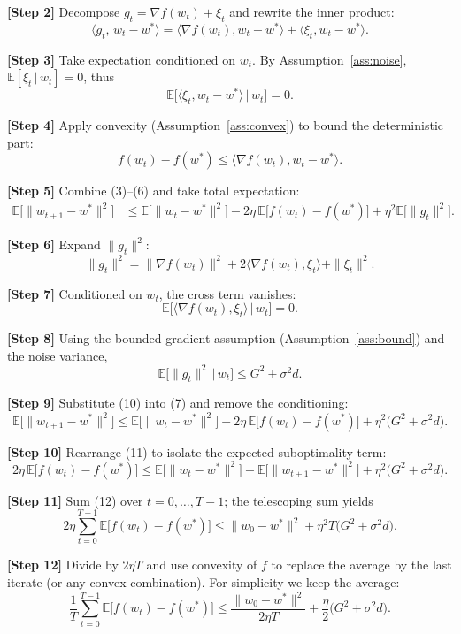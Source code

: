 \documentclass{article}
\newcommand{\E}{\mathbb{E}}
\begin{document}
\noindent\textbf{[Step 2]}  Decompose $g_t=\nabla f(w_t)+\xi_t$ and rewrite the inner product:
\[
\langle g_t,\,w_t-w^{*}\rangle
= \langle\nabla f(w_t),w_t-w^{*}\rangle
+ \langle\xi_t,w_t-w^{*}\rangle .
\tag{4}
\]

\noindent\textbf{[Step 3]}  Take expectation conditioned on $w_t$.  By Assumption~\ref{ass:noise}, $\E[\xi_t\,|\,w_t]=0$, thus
\[
\E\!\big[\langle\xi_t,w_t-w^{*}\rangle\,\big|\,w_t\big]=0.
\tag{5}
\]

\noindent\textbf{[Step 4]}  Apply convexity (Assumption~\ref{ass:convex}) to bound the deterministic part:
\[
f(w_t)-f(w^{*})\le \langle\nabla f(w_t), w_t-w^{*}\rangle .
\tag{6}
\]

\noindent\textbf{[Step 5]}  Combine (3)–(6) and take total expectation:
\[
\begin{aligned}
\E\!\big[\|w_{t+1}-w^{*}\|^{2}\big]
&\le \E\!\big[\|w_t-w^{*}\|^{2}\big]
-2\eta\,\E\!\big[f(w_t)-f(w^{*})\big]
+\eta^{2}\E\!\big[\|g_t\|^{2}\big].
\end{aligned}
\tag{7}
\]

\noindent\textbf{[Step 6]}  Expand $\|g_t\|^{2}$:
\[
\|g_t\|^{2}
= \|\nabla f(w_t)\|^{2}+2\langle\nabla f(w_t),\xi_t\rangle+\|\xi_t\|^{2}.
\tag{8}
\]

\noindent\textbf{[Step 7]}  Conditioned on $w_t$, the cross term vanishes:
\[
\E\!\big[\langle\nabla f(w_t),\xi_t\rangle\,\big|\,w_t\big]=0.
\tag{9}
\]

\noindent\textbf{[Step 8]}  Using the bounded‑gradient assumption (Assumption~\ref{ass:bound}) and the noise variance,
\[
\E\!\big[\|g_t\|^{2}\,\big|\,w_t\big]
\le G^{2}+\sigma^{2}d .
\tag{10}
\]

\noindent\textbf{[Step 9]}  Substitute (10) into (7) and remove the conditioning:
\[
\E\!\big[\|w_{t+1}-w^{*}\|^{2}\big]
\le \E\!\big[\|w_t-w^{*}\|^{2}\big]
-2\eta\,\E\!\big[f(w_t)-f(w^{*})\big]
+\eta^{2}\bigl(G^{2}+\sigma^{2}d\bigr).
\tag{11}
\]

\noindent\textbf{[Step 10]}  Rearrange (11) to isolate the expected suboptimality term:
\[
2\eta\,\E\!\big[f(w_t)-f(w^{*})\big]
\le \E\!\big[\|w_t-w^{*}\|^{2}\big]
-\E\!\big[\|w_{t+1}-w^{*}\|^{2}\big]
+\eta^{2}\bigl(G^{2}+\sigma^{2}d\bigr).
\tag{12}
\]

\noindent\textbf{[Step 11]}  Sum (12) over $t=0,\dots,T-1$; the telescoping sum yields
\[
2\eta\sum_{t=0}^{T-1}\E\!\big[f(w_t)-f(w^{*})\big]
\le \|w_0-w^{*}\|^{2}
+\eta^{2}T\bigl(G^{2}+\sigma^{2}d\bigr).
\tag{13}
\]

\noindent\textbf{[Step 12]}  Divide by $2\eta T$ and use convexity of $f$ to replace the average by the last iterate (or any convex combination).  For simplicity we keep the average:
\[
\frac{1}{T}\sum_{t=0}^{T-1}\E\!\big[f(w_t)-f(w^{*})\big]
\le
\frac{\|w_0-w^{*}\|^{2}}{2\eta T}
+\frac{\eta}{2}\bigl(G^{2}+\sigma^{2}d\bigr).
\tag{14}
\]
\end{document}
